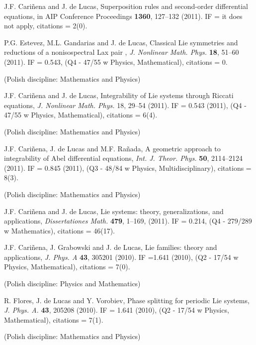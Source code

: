 \documentclass[12pt,reqno]{amsbook}
\begin{document}
\begin{enumerate}
{ \item J.F. Cari\~nena and J. de Lucas, \color{blue}Superposition rules and second-order differential equations\color{black}, in AIP Conference Proceedings   {\bf 1360},  127--132 (2011).  IF = it does not apply, citations = 2(0). } 
%

{ \item P.G. Estevez, M.L. Gandarias and J. de Lucas, \color{blue} Classical Lie symmetries and reductions of a nonisospectral Lax pair \color{black}, {\it J. Nonlinear Math. Phys.} {\bf 18}, 51--60 (2011).  IF = 0.543, (Q4 - 47/55 w Physics, Mathematical), citations = 0.} (Polish discipline: Mathematics and Physics)

{ 
\item J.F. Cari\~nena and J. de Lucas, \color{blue} Integrability of Lie systems through Riccati equations,\color{black} {\it J. Nonlinear Math. Phys.} 18, 29--54 (2011). IF = 0.543 (2011), (Q4 - 47/55 w Physics, Mathematical), citations = 6(4).} (Polish discipline: Mathematics and Physics)


{ 
\item J.F. Cari\~nena, J. de Lucas and M.F. Ra\~nada, \color{blue} A geometric approach to integrability of Abel differential equations\color{black}, {\it Int. J. Theor. Phys.} {\bf  50}, 2114--2124 (2011). IF = 0.845 (2011), (Q3 - 48/84 w Physics, Multidisciplinary), citations = 8(3).} (Polish discipline: Mathematics and Physics)

{ \item J.F. Cari\~nena and J. de Lucas, \color{blue}Lie systems: theory, generalizations, and applications\color{black}, {\it Dissertationes Math.} {\bf 479}, 1--169, (2011).  IF = 0.214, (Q4 - 279/289 w Mathematics), citations = 46(17).} 

{ \item J.F. Cari\~nena, J. Grabowski and J. de Lucas, \color{blue} Lie families: theory and applications\color{black}, {\it J. Phys. A} {\bf 43}, 305201 (2010). IF =1.641 (2010), (Q2 - 17/54 w Physics, Mathematical), citations = 7(0).} (Polish discipline: Physics and Mathematics)


{ \item R. Flores, J. de Lucas and Y. Vorobiev, \color{blue} Phase splitting for periodic Lie systems\color{black}, {\it J. Phys. A.} {\bf 43}, 205208 (2010). IF = 1.641 (2010), (Q2 - 17/54 w Physics, Mathematical), citations = 7(1).} (Polish discipline: Mathematics and Physics)




\end{enumerate}
\end{document}
